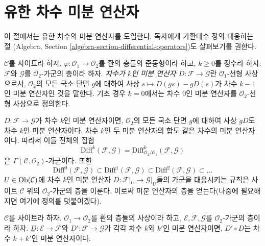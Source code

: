 \section{유한 차수 미분 연산자}
\label{section-differential-operators}

\noindent
이 절에서는 유한 차수의 미분 연산자를 도입한다.
독자에게 가환대수 장의 대응하는 절
(Algebra, Section \ref{algebra-section-differential-operators})도
살펴보기를 권한다.

\begin{definition}
\label{definition-differential-operators}
$\mathcal{C}$를 사이트라 하자. $\varphi : \mathcal{O}_1 \to \mathcal{O}_2$를
환의 층들의 준동형이라 하고, $k \geq 0$를 정수라 하자.
$\mathcal{F}$와 $\mathcal{G}$를 $\mathcal{O}_2$-가군의 층이라 하자.
{\it 차수가 $k$인 미분 연산자 $D : \mathcal{F} \to \mathcal{G}$}란
$\mathcal{O}_1$-선형 사상으로서, $\mathcal{O}_2$의 모든 국소 단면
$g$에 대하여 사상 $s \mapsto D(gs) - gD(s)$가 차수 $k - 1$인
미분 연산자인 것을 말한다. 기초 경우 $k = 0$에서는 차수 $0$인
미분 연산자를 $\mathcal{O}_2$-선형 사상으로 정의한다.
\end{definition}

\noindent
$D : \mathcal{F} \to \mathcal{G}$가 차수 $k$인 미분 연산자이면,
$\mathcal{O}_2$의 모든 국소 단면 $g$에 대하여 사상 $gD$도
차수 $k$인 미분 연산자이다. 차수 $k$인 두 미분 연산자의 합도
같은 차수의 미분 연산자이다. 따라서 이들 전체의 집합
$$
\text{Diff}^k(\mathcal{F}, \mathcal{G}) =
\text{Diff}^k_{\mathcal{O}_2/\mathcal{O}_1}(\mathcal{F}, \mathcal{G})
$$
은 $\Gamma(\mathcal{C}, \mathcal{O}_2)$-가군이다. 또한
$$
\text{Diff}^0(\mathcal{F}, \mathcal{G}) \subset
\text{Diff}^1(\mathcal{F}, \mathcal{G}) \subset
\text{Diff}^2(\mathcal{F}, \mathcal{G}) \subset \ldots
$$
$U \in \mathop{\mathrm{Ob}}\nolimits(\mathcal{C})$에 차수 $k$인 미분 연산자
$D : \mathcal{F}|_U \to \mathcal{G}|_U$들의 가군을 대응시키는 규칙은
사이트 $\mathcal{C}$ 위의 $\mathcal{O}_2$-가군의 층을 이룬다.
이로써 미분 연산자의 층을 얻는다(나중에 필요해지면 여기에 정의를
덧붙이겠다).

\begin{lemma}
\label{lemma-composition-differential-operators}
$\mathcal{C}$를 사이트라 하자.
$\mathcal{O}_1 \to \mathcal{O}_2$를 환의 층들의 사상이라 하고,
$\mathcal{E}, \mathcal{F}, \mathcal{G}$를 $\mathcal{O}_2$-가군의 층이라 하자.
$D : \mathcal{E} \to \mathcal{F}$와 $D' : \mathcal{F} \to \mathcal{G}$가
각각 차수 $k$와 $k'$인 미분 연산자이면, $D' \circ D$는 차수
$k + k'$인 미분 연산자이다.
\end{lemma}

